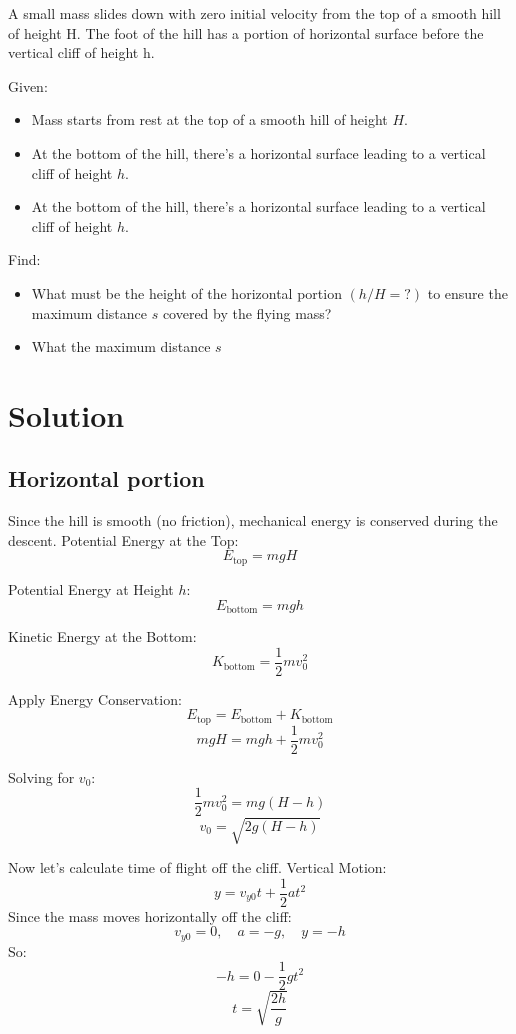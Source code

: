 A small mass slides down with zero initial velocity from the top of a smooth hill of height H.
The foot of the hill has a portion of horizontal surface 
before the vertical cliff of height h.


\bigbreak Given: 
\begin{itemize}
    \item Mass starts from rest at the top of a smooth hill of height \( H \).
    \item At the bottom of the hill, there's a horizontal surface leading to a vertical cliff of height \( h \).
    \item At the bottom of the hill, there's a horizontal surface leading to a vertical cliff of height \( h \).
\end{itemize}

\bigbreak Find: 
\begin{itemize}
    \item What must be the height of the horizontal portion $(h/H = ?)$ to ensure the maximum distance $s$
    covered by the flying mass?
    \item What the maximum distance $s$
\end{itemize}

\section*{Solution} \subsection*{Horizontal portion}

Since the hill is smooth (no friction), mechanical energy is conserved during the descent.
\bigbreak Potential Energy at the Top:
  \[
  E_{\text{top}} = m g H
  \]

\smallbreak Potential Energy at Height \( h \):
  \[
  E_{\text{bottom}} = m g h
  \]

\smallbreak Kinetic Energy at the Bottom:
  \[
  K_{\text{bottom}} = \frac{1}{2} m v_0^2
  \]

\smallbreak Apply Energy Conservation:
\[
E_{\text{top}} = E_{\text{bottom}} + K_{\text{bottom}}
\]
\[
m g H = m g h + \frac{1}{2} m v_0^2
\]

\smallbreak Solving for \( v_0 \):
$$ \frac{1}{2} m v_0^2 = m g (H - h) $$
$$ v_0 = \sqrt{2 g (H - h)} $$


\bigbreak Now let's calculate time of flight off the cliff.
\smallbreak Vertical Motion:
  \[
  y = v_{y0} t + \frac{1}{2} a t^2
  \] \smallbreak 
  Since the mass moves horizontally off the cliff:
  \[
  v_{y0} = 0, \quad a = -g, \quad y = -h
  \] \smallbreak 
  So:
  $$
  -h = 0 - \frac{1}{2} g t^2 $$
  $$ t = \sqrt{\frac{2 h}{g}}
  $$


